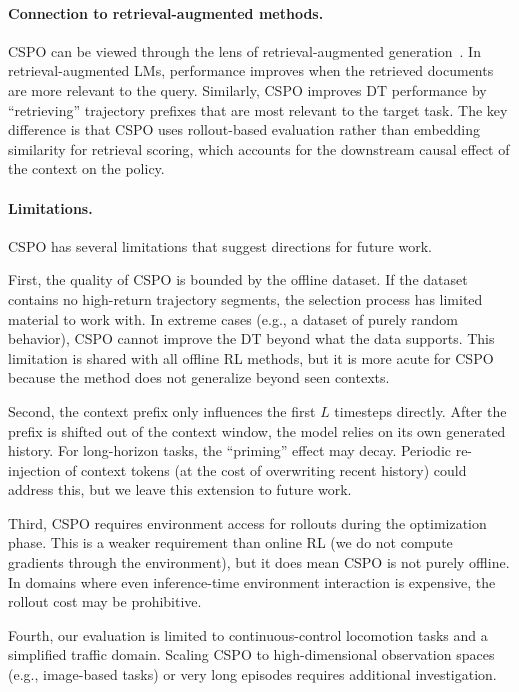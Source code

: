 \documentclass{article}
\newcommand{\cspo}{\textsc{CSPO}}
\begin{document}
\paragraph{Connection to retrieval-augmented methods.}
\cspo{} can be viewed through the lens of retrieval-augmented generation~\citep{borgeaud2022improving, ram2023incontext}. In retrieval-augmented LMs, performance improves when the retrieved documents are more relevant to the query. Similarly, \cspo{} improves DT performance by ``retrieving'' trajectory prefixes that are most relevant to the target task. The key difference is that \cspo{} uses rollout-based evaluation rather than embedding similarity for retrieval scoring, which accounts for the downstream causal effect of the context on the policy.

\paragraph{Limitations.}
\cspo{} has several limitations that suggest directions for future work.

First, the quality of \cspo{} is bounded by the offline dataset. If the dataset contains no high-return trajectory segments, the selection process has limited material to work with. In extreme cases (e.g., a dataset of purely random behavior), \cspo{} cannot improve the DT beyond what the data supports. This limitation is shared with all offline RL methods, but it is more acute for \cspo{} because the method does not generalize beyond seen contexts.

Second, the context prefix only influences the first $L$ timesteps directly. After the prefix is shifted out of the context window, the model relies on its own generated history. For long-horizon tasks, the ``priming'' effect may decay. Periodic re-injection of context tokens (at the cost of overwriting recent history) could address this, but we leave this extension to future work.

Third, \cspo{} requires environment access for rollouts during the optimization phase. This is a weaker requirement than online RL (we do not compute gradients through the environment), but it does mean \cspo{} is not purely offline. In domains where even inference-time environment interaction is expensive, the rollout cost may be prohibitive.

Fourth, our evaluation is limited to continuous-control locomotion tasks and a simplified traffic domain. Scaling \cspo{} to high-dimensional observation spaces (e.g., image-based tasks) or very long episodes requires additional investigation.
\end{document}
